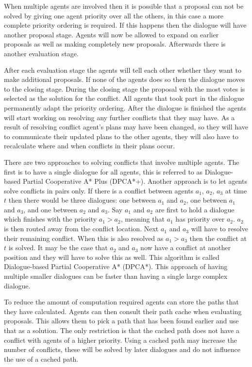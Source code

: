 When multiple agents are involved then it is possible that a proposal can not
be solved by giving one agent priority over all the others, in this case a more
complete priority ordering is required. If this happens then the dialogue will
have another proposal stage. Agents will now be allowed to expand on earlier
proposals as well as making completely new proposals. Afterwards there is
another evaluation stage.

After each evaluation stage the agents will tell each other whether they want
to make additional proposals. If none of the agents does so then the dialogue
moves to the closing stage. During the closing stage the proposal with the most
votes is selected as the solution for the conflict. All agents that took part
in the dialogue permanently adapt the priority ordering. After the dialogue is
finished the agents will start working on resolving any further conflicts that
they may have. As a result of resolving conflict agent's plans may have been
changed, so they will have to communicate their updated plans to the other
agents, they will also have to recalculate where and when conflicts in their
plans occur.

There are two approaches to solving conflicts that involve multiple agents. The
first is to have a single dialogue for all agents, this is referred to as
Dialogue-based Partial Cooperative A* Plus (DPCA*+). Another approach is to let
agents solve conflicts in pairs only. If there is a conflict between agents
$a_1$, $a_2$, $a_3$ at time $t$ then there would be three dialogues: one
between $a_1$ and $a_2$, one between $a_1$ and $a_3$, and one between $a_2$ and
$a_3$. Say $a_1$ and $a_2$ are first to hold a dialogue which finishes with the
priority $a_1 > a_2$, meaning that $a_1$ has priority over $a_2$. $a_2$ is then
routed away from the conflict location. Next $a_1$ and $a_3$ will have to
resolve their remaining conflict. When this is also resolved as $a_1 > a_3$
then the conflict at $t$ is solved. It may be the case that $a_2$ and $a_3$ now
have a conflict at another position and they will have to solve this as well.
This algorithm is called Dialogue-based Partial Cooperative A* (DPCA*). This
approach of having multiple smaller dialogues can be faster than having a
single large complex dialogue.

To reduce the amount of computation required agents can store the paths that
they have calculated. Agents can then consult their path cache when evaluating
proposals. This allows them to pick a path that has been found earlier and use
that as a solution. The only restriction is that the cached path does not have
a conflict with agents of a higher priority. Using a cached path may increase
the number of conflicts, these will be solved by later dialogues and do not
influence the use of a cached path.


